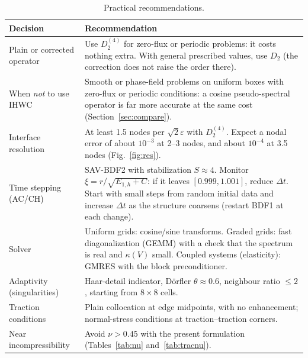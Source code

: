 \documentclass[preprint,12pt]{elsarticle}
\theoremstyle{remark}
\begin{document}
\begin{table}[H]\centering\footnotesize
\caption{Practical recommendations.}\label{tab:guide}
\begin{tabular}{p{}p{}}
\toprule
Decision & Recommendation\\
\midrule
Plain or corrected operator & Use $D_2^{(4)}$ for zero-flux or periodic problems: it costs nothing extra. With general prescribed values, use $D_2$ (the correction does not raise the order there).\\
When \emph{not} to use IHWC & Smooth or phase-field problems on uniform boxes with zero-flux or periodic conditions: a cosine pseudo-spectral operator is far more accurate at the same cost (Section~\ref{sec:compare}).\\
Interface resolution & At least 1.5 nodes per $\sqrt2\varepsilon$ with $D_2^{(4)}$. Expect a nodal error of about $10^{-3}$ at 2--3 nodes, and about $10^{-4}$ at 3.5 nodes (Fig.~\ref{fig:res}).\\
Time stepping (AC/CH) & SAV-BDF2 with stabilization $S\approx4$. Monitor $\xi=r/\sqrt{E_{1,h}+C}$: if it leaves $[0.999,1.001]$, reduce $\Delta t$. Start with small steps from random initial data and increase $\Delta t$ as the structure coarsens (restart BDF1 at each change).\\
Solver & Uniform grids: cosine/sine transforms. Graded grids: fast diagonalization (GEMM) with a check that the spectrum is real and $\kappa(V)$ small. Coupled systems (elasticity): GMRES with the block preconditioner.\\
Adaptivity (singularities) & Haar-detail indicator, D\"orfler $\theta\approx0.6$, neighbour ratio $\le2$, starting from $8\times8$ cells.\\
Traction conditions & Plain collocation at edge midpoints, with no enhancement; normal-stress conditions at traction--traction corners.\\
Near incompressibility & Avoid $\nu>0.45$ with the present formulation (Tables~\ref{tab:nu} and~\ref{tab:tracnu}).\\
\bottomrule
\end{tabular}
\end{table}

\end{document}
